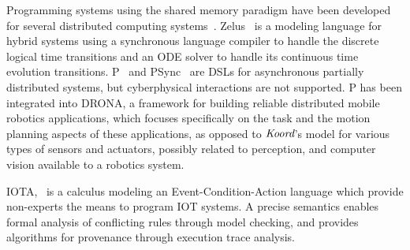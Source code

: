 
%
Programming systems using the  shared memory paradigm have been developed for several distributed computing systems~\cite{dsm1991,Adve96sharedmemory,Azure,Cassandra,Dynamo}.  Zelus~\cite{zelus1} is a modeling language for hybrid systems using a synchronous language compiler to handle the discrete logical time transitions and an ODE solver to handle its continuous time evolution transitions. P~\cite{Planguage}  and PSync~\cite{PSyncLanguage} are DSLs for asynchronous partially distributed systems, but cyberphysical interactions are not supported. P has been integrated into DRONA, a framework for building reliable distributed mobile robotics applications, which focuses specifically on the task and the motion planning aspects of these applications, as opposed to $\emph{Koord}$'s model for various types of sensors and actuators, possibly related to perception, and computer vision available to a robotics system.


%
 IOTA,~\cite{iota} is a calculus modeling an Event-Condition-Action language which provide non-experts the means to program IOT systems. A precise semantics enables formal analysis of conflicting rules through model checking, and provides algorithms for provenance through execution trace analysis.




